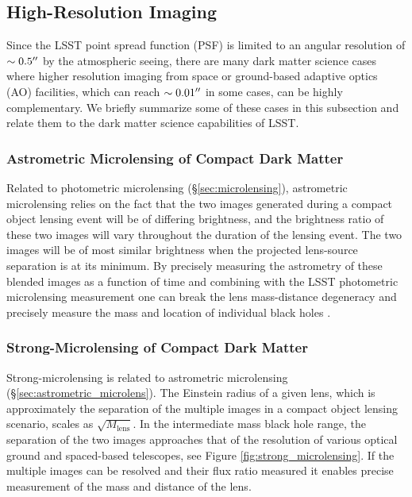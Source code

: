 
\subsection{High-Resolution Imaging }
\label{sec:highres}

Since the LSST point spread function (PSF) is limited to an angular resolution of $\sim 0.5\mbox{$^{\prime\prime}$}$ by the atmospheric seeing, there are many dark matter science cases where higher resolution imaging from space or ground-based adaptive optics (AO) facilities, which can reach $\sim 0.01\mbox{$^{\prime\prime}$}$ in some cases, can be highly complementary. We briefly summarize some of these cases in this subsection and relate them to the dark matter science capabilities of LSST.

\subsubsection{Astrometric Microlensing of Compact Dark Matter }
\label{sec:astrometric_microlens}
Related to photometric microlensing (\S\ref{sec:microlensing}), astrometric microlensing relies on the fact that the two images generated during a compact object lensing event will be of differing brightness, and the brightness ratio of these two images will vary throughout the duration of the lensing event.
The two images will be of most similar brightness when the projected lens-source separation is at its minimum.
By precisely measuring the astrometry of these blended images as a function of time and combining with the LSST photometric microlensing measurement one can break the lens mass-distance degeneracy and precisely measure the mass and location of individual black holes \cite{2015ApJ...814L..11Y}.

\subsubsection{Strong-Microlensing of Compact Dark Matter }
Strong-microlensing is related to astrometric microlensing (\S\ref{sec:astrometric_microlens}).
The Einstein radius of a given lens, which is approximately the separation of the multiple images in a compact object lensing scenario, scales as $\sqrt{M_\mathrm{lens}}$.
In the intermediate mass black hole range, the separation of the two images approaches that of the resolution of various optical ground and spaced-based telescopes, see Figure \ref{fig:strong_microlensing}.
If the multiple images can be resolved and their flux ratio measured it enables precise measurement of the mass and distance of the lens.

